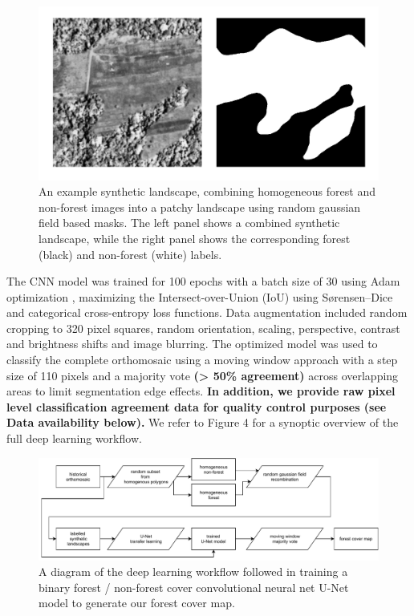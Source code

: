 \documentclass[remote sensing,article,submit,moreauthors,pdftex]{mdpi}
\begin{document}
\begin{figure}

{\centering \includegraphics[width=1\linewidth]{./figures/synthetic_landscape} 

}

\caption{An example synthetic landscape, combining homogeneous forest and non-forest images into a patchy landscape using random gaussian field based masks. The left panel shows a combined synthetic landscape, while the right panel shows the corresponding forest (black) and non-forest (white) labels.}\label{fig:unnamed-chunk-4}
\end{figure}

The CNN model was trained for 100 epochs with a batch size of 30 using
Adam optimization \citep{kingma2017}, maximizing the
Intersect-over-Union (IoU) using Sørensen--Dice \citep{dice1945} and
categorical cross-entropy loss functions. Data augmentation included
random cropping to 320 pixel squares, random orientation, scaling,
perspective, contrast and brightness shifts and image blurring. The
optimized model was used to classify the complete orthomosaic using a
moving window approach with a step size of 110 pixels and a majority
vote \textbf{(\textgreater{} 50\% agreement)} across overlapping areas
to limit segmentation edge effects. \textbf{In addition, we provide raw
pixel level classification agreement data for quality control purposes
(see Data availability below).} We refer to Figure 4 for a synoptic
overview of the full deep learning workflow.

\begin{figure}

{\centering \includegraphics[width=1\linewidth]{./figures/cnn_diagram} 

}

\caption{A diagram of the deep learning workflow followed in training a binary forest / non-forest cover convolutional neural net U-Net model to generate our forest cover map.}\label{fig:unnamed-chunk-5}
\end{figure}
\end{document}
